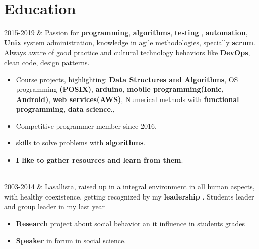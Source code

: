 \documentclass[
    changecolor={111, 156, 45}, 
]{cv-roald}
\newcommand{\RomanNumeralCaps}[1]
    {\MakeUppercase{\romannumeral #1}}
\begin{document}
\section*{Education}
\begin{tabularcv}
2015-2019   &    
                \newline Passion for \textbf{programming}, \textbf{algorithms}, \textbf{testing} , \textbf{automation}, \textbf{Unix} system administration,  knowledge in agile methodologies, specially \textbf{scrum}. Always aware of good practice and cultural technology behaviors like \textbf{DevOps}, clean code,  design patterns.
                
                \begin{itemize}
				  \item Course projects, highlighting: \textbf{Data Structures and Algorithms}, OS programming  \textbf{(POSIX)}, \textbf{arduino}, \textbf{mobile programming(Ionic, Android)}, \textbf{web services(AWS)}, Numerical methods with \textbf{functional programming}, \textbf{data science}., 
				  \item Competitive programmer member since 2016.
				  \item skills to solve problems with \textbf{algorithms}.
				  \item \textbf{I like to gather resources and learn from them}.
                \end{itemize}
                \\
                
2003-2014   &     
                \newline Lasallista, raised up in a integral environment in all human aspects, with healthy coexistence, getting recognized by my \textbf{leadership }. Students leader and group leader in my last year
                \begin{itemize}
				  \item  \textbf{Research} project about social behavior an it influence in students grades
                  \item \textbf{Speaker} in \RomanNumeralCaps{2} forum in  social science.
                \end{itemize} 

                
\end{tabularcv}
\end{document}
